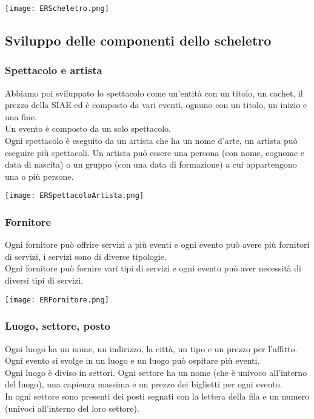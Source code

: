 \documentclass[a4paper,11pt]{article}
\begin{document}
\vspace*{1em}
\texttt{[image: ERScheletro.png]}
 
\subsection{Sviluppo delle componenti dello scheletro}

\subsubsection*{Spettacolo e artista}

Abbiamo poi sviluppato lo spettacolo come un'entità con un titolo, un cachet, il prezzo della SIAE ed è composto da vari eventi, ognuno con un titolo, un inizio e una fine.\\
Un evento è composto da un solo spettacolo.\\
Ogni spettacolo è eseguito da un artista che ha un nome d'arte, un artista può eseguire più spettacoli.
Un artista può essere una persona (con nome, cognome e data di nascita) o un gruppo (con una data di formazione) a cui appartengono una o più persone.

\texttt{[image: ERSpettacoloArtista.png]}

\subsubsection*{Fornitore}

Ogni fornitore può offrire servizi a più eventi e ogni evento può avere più fornitori di servizi, i servizi sono di diverse tipologie.\\
Ogni fornitore può fornire vari tipi di servizi e ogni evento può aver necessità di diversi tipi di servizi.

\texttt{[image: ERFornitore.png]}

\subsubsection*{Luogo, settore, posto}

Ogni luogo ha un nome, un indirizzo, la città, un tipo e un prezzo per l'affitto.
Ogni evento si svolge in un luogo e un luogo può ospitare più eventi.\\
Ogni luogo è diviso in settori.
Ogni settore ha un nome (che è univoco all'interno del luogo), una capienza massima e un prezzo dei biglietti per ogni evento.\\
In ogni settore sono presenti dei posti segnati con la lettera della fila e un numero (univoci all'interno del loro settore).
\end{document}

